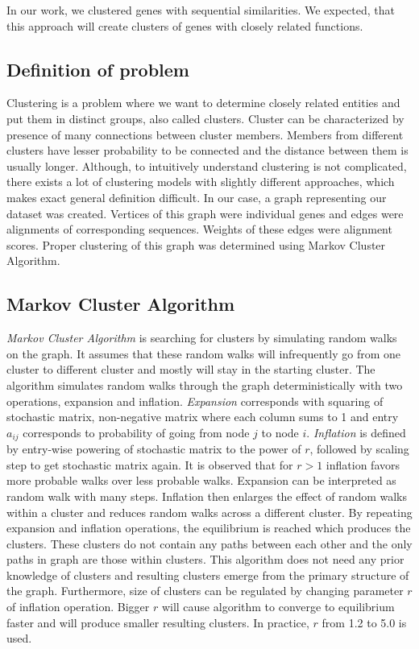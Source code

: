 In our work, we clustered genes with sequential similarities.
We expected, that this approach will create clusters of genes with closely related functions.

\subsection{Definition of problem}
Clustering is a problem where we want to determine closely related entities and put them in distinct groups, also called clusters.
Cluster can be characterized by presence of many connections between cluster members.
Members from different clusters have lesser probability to be connected and the distance between them is usually longer.
Although, to intuitively understand clustering is not complicated, there exists a lot of clustering models with slightly different approaches, which makes exact general definition difficult.
In our case, a graph representing our dataset was created.
Vertices of this graph were individual genes and edges were alignments of corresponding sequences.
Weights of these edges were alignment scores.
Proper clustering of this graph was determined using Markov Cluster Algorithm. 

\subsection{Markov Cluster Algorithm}
\emph{Markov Cluster Algorithm} \cite{mcl} is searching for clusters by simulating random walks on the graph.
It assumes that these random walks will infrequently go from one cluster to different cluster and mostly will stay in the starting cluster.
The algorithm simulates random walks through the graph deterministically with two operations, expansion and inflation.
\emph{Expansion} corresponds with squaring of stochastic matrix, non-negative matrix where each column sums to 1 and entry $a_{ij}$ corresponds to probability of going from node $j$ to node $i$.
\emph{Inflation} is defined by entry-wise powering of stochastic matrix to the power of $r$, followed by scaling step to get stochastic matrix again.
It is observed that for $r>1$ inflation favors more probable walks over less probable walks.
Expansion can be interpreted as random walk with many steps.
Inflation then enlarges the effect of random walks within a cluster and reduces random walks across a different cluster.
By repeating expansion and inflation operations, the equilibrium is reached which produces the clusters.
These clusters do not contain any paths between each other and the only paths in graph are those within clusters.
This algorithm does not need any prior knowledge of clusters and resulting clusters emerge from the primary structure of the graph.
Furthermore, size of clusters can be regulated by changing parameter $r$ of inflation operation.
Bigger $r$ will cause algorithm to converge to equilibrium faster and will produce smaller resulting clusters.
In practice, $r$ from 1.2 to 5.0 is used.